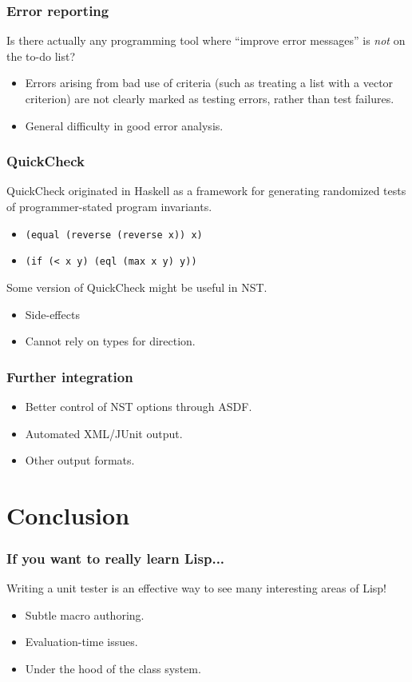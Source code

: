 \documentclass{beamer}
\begin{document}
\begin{frame}
  \frametitle{Error reporting}

  Is there actually any programming tool where ``improve error
  messages'' is \emph{not} on the to-do list?
  \begin{itemize}
  \item Errors arising from bad use of criteria (such as treating a
    list with a vector criterion) are not clearly marked as testing
    errors, rather than test failures.
  \item General difficulty in good error analysis.
  \end{itemize}
\end{frame}

\begin{frame}
  \frametitle{QuickCheck}

  QuickCheck originated in Haskell as a framework for generating
  randomized tests of programmer-stated program invariants.
  \begin{itemize}
  \item\texttt{(equal  (reverse (reverse x))  x)}
  \item\texttt{(if (< x y) (eql (max x y) y))}
  \end{itemize}
  Some version of QuickCheck might be useful in NST.
  \begin{itemize}
  \item Side-effects
  \item Cannot rely on types for direction.
  \end{itemize}
\end{frame}

\begin{frame}
  \frametitle{Further integration}

  \begin{itemize}
  \item Better control of NST options through ASDF.
  \item Automated XML/JUnit output.
  \item Other output formats.
  \end{itemize}
\end{frame}

\section{Conclusion}

\begin{frame}
  \frametitle{If you want to really learn Lisp...}

  Writing a unit tester is an effective way to see many interesting
  areas of Lisp!
  \begin{itemize}
  \item Subtle macro authoring.
  \item Evaluation-time issues.
  \item Under the hood of the class system.
  \end{itemize}
\end{frame}
\end{document}
